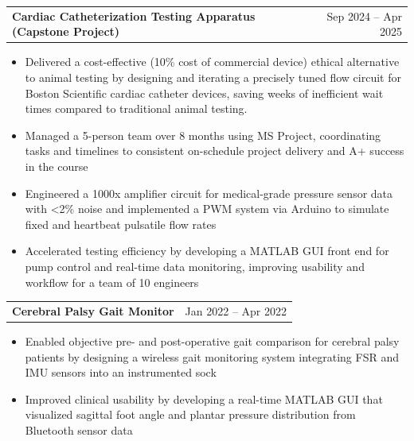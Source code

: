 \documentclass[a4paper,10pt]{article}
\begin{document}
\begin{tabularx}{\linewidth}{@{}X r@{}}
\begin{minipage}[t]{\linewidth}
  \textbf{Cardiac Catheterization Testing Apparatus (Capstone Project)}
\end{minipage}
&     Sep 2024 -- Apr 2025
\end{tabularx}


\begin{itemize}[nosep,after=\strut, leftmargin=1em, itemsep=3pt,label=--]
  \item Delivered a cost-effective (10\% cost of commercial device) ethical alternative to animal testing by designing and iterating a precisely tuned flow circuit for Boston Scientific cardiac catheter devices, saving weeks of inefficient wait times compared to traditional animal testing.
\item Managed a 5-person team over 8 months using MS Project, coordinating tasks and timelines to consistent on-schedule project delivery and A+ success in the course
\item Engineered a 1000x amplifier circuit for medical-grade pressure sensor data with <2\% noise and implemented a PWM system via Arduino to simulate fixed and heartbeat pulsatile flow rates
\item Accelerated testing efficiency by developing a MATLAB GUI front end for pump control and real-time data monitoring, improving usability and workflow for a team of 10 engineers
\end{itemize}


\begin{tabularx}{\linewidth}{@{}X r@{}}
\begin{minipage}[t]{\linewidth}
  \textbf{Cerebral Palsy Gait Monitor}
\end{minipage}
&     Jan 2022 -- Apr 2022
\end{tabularx}


\begin{itemize}[nosep,after=\strut, leftmargin=1em, itemsep=3pt,label=--]
  \item Enabled objective pre- and post-operative gait comparison for cerebral palsy patients by designing a wireless gait monitoring system integrating FSR and IMU sensors into an instrumented sock
\item Improved clinical usability by developing a real-time MATLAB GUI that visualized sagittal foot angle and plantar pressure distribution from Bluetooth sensor data
\end{itemize}
\end{document}
